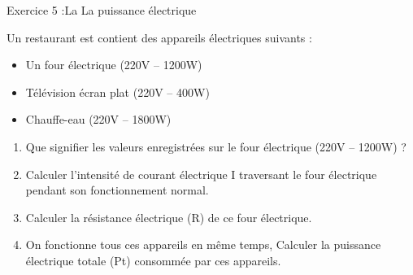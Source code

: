 \documentclass[12pt, french]{article}
\begin{document}
   \begin{Box2}{Exercice 5 :La La puissance électrique} 
   
	   Un restaurant est contient des appareils électriques suivants :
	   \begin{itemize}
		   \item Un four électrique (220V – 1200W)
		   \item Télévision écran plat (220V – 400W)
		   \item Chauffe-eau (220V – 1800W)
	   \end{itemize}
	   \begin{enumerate}
		   \item Que signifier les valeurs enregistrées sur le four électrique (220V – 1200W) ?
		   \item Calculer l’intensité de courant électrique I traversant le four électrique pendant
son fonctionnement normal.
\item Calculer la résistance électrique (R) de ce four électrique.
\item On fonctionne tous ces appareils en même temps,  Calculer la puissance électrique totale (Pt) consommée par ces appareils.
	   \end{enumerate}

   \end{Box2}
\end{document}
